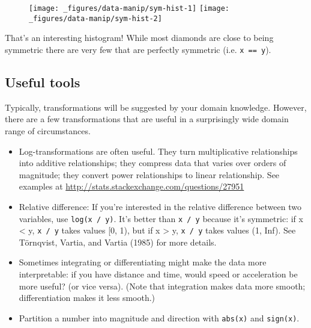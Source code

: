 \begin{Shaded}
\begin{Highlighting}[]
\NormalTok{(}\StringTok{ }
\StringTok{  }\NormalTok{(} \NormalTok{)}

\StringTok{ }\StringTok{ }\NormalTok{)}
\NormalTok{(}\StringTok{ }
\StringTok{  }\NormalTok{(} \NormalTok{)}
\end{Highlighting}
\end{Shaded}

\begin{figure}[H]
  \texttt{[image: \_figures/data-manip/sym-hist-1]}%
  \texttt{[image: \_figures/data-manip/sym-hist-2]}
\end{figure}

That's an interesting histogram! While most diamonds are close to being
symmetric there are very few that are perfectly symmetric (i.e.
\texttt{x\ ==\ y}).

\subsection{Useful tools}

Typically, transformations will be suggested by your domain knowledge.
However, there are a few transformations that are useful in a
surprisingly wide domain range of circumstances.

\begin{itemize}
\item
  Log-transformations are often useful. They turn multiplicative
  relationships into additive relationships; they compress data that
  varies over orders of magnitude; they convert power relationships to
  linear relationship. See examples at
  \url{http://stats.stackexchange.com/questions/27951}
\item
  Relative difference: If you're interested in the relative difference
  between two variables, use \texttt{log(x\ /\ y)}. It's better than
  \texttt{x\ /\ y} because it's symmetric: if x \textless{} y,
  \texttt{x\ /\ y} takes values {[}0, 1), but if x \textgreater{} y,
  \texttt{x\ /\ y} takes values (1, Inf). See Törnqvist, Vartia, and
  Vartia (1985) for more details. 
\item
  Sometimes integrating or differentiating might make the data more
  interpretable: if you have distance and time, would speed or
  acceleration be more useful? (or vice versa). (Note that integration
  makes data more smooth; differentiation makes it less smooth.)
\item
  Partition a number into magnitude and direction with \texttt{abs(x)}
  and \texttt{sign(x)}.
\end{itemize}

